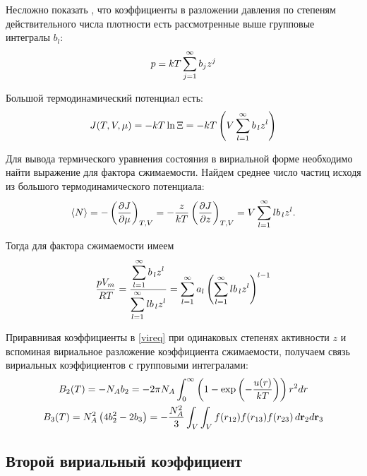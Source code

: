 Несложно показать \cite{meyson}, что коэффициенты в разложении давления по степеням действительного числа плотности есть рассмотренные выше групповые интегралы $b_l$: 
\vverh
\begin{gather}
	p = k T \sum_{j=1}^\infty b_j z^j \notag
\end{gather}

Большой термодинамический потенциал есть:
\vverh
\begin{gather}
	J(T, V, \mu) = - k T \ln \Xi = -k T \left( V \sum_{l=1}^\infty b_{\, l} z^l \right) \notag
\end{gather}

Для вывода термического уравнения состояния в вириальной форме необходимо найти выражение для фактора сжимаемости. Найдем среднее число частиц исходя из большого термодинамического потенциала:
\vverh
\begin{gather}
	\langle N \rangle = - \left( \frac{\partial J}{\partial \mu} \right)_{T, V} = - \frac{z}{kT} \left( \frac{\partial J}{\partial z} \right)_{T, V} = V \sum_{l = 1}^\infty l b_{\, l} z^l. \notag
\end{gather}

Тогда для фактора сжимаемости имеем
\vverh
\begin{gather}
	\frac{p V_m}{RT} = \frac{\displaystyle \sum_{l = 1}^\infty b_{\, l} z^l}{\displaystyle \sum_{l = 1}^\infty l b_{\, l} z^l} = \sum_{l = 1}^\infty a_l \left( \sum_{l = 1}^\infty  l b_{\, l} z^l \right)^{l - 1} \label{vireq}
\end{gather}

Приравнивая коэффициенты в \eqref{vireq} при одинаковых степенях активности $z$ и вспоминая вириальное разложение коэффициента сжимаемости, получаем связь вириальных коэффициентов с групповыми интегралами:
\vverh
\begin{gather}
	B_2(T) = - N_A b_2 = - 2 \pi N_A \int_0^\infty \left( 1 - \exp \left( -\frac{u(r)}{kT} \right) \right) r^2 d r \notag  \\
	B_3(T) = N_A^2 \left( 4 b_2^2 - 2 b_3 \right) = - \frac{N_A^2}{3} \int_V \int_V f(r_{12}) f(r_{13}) f(r_{23}) \, d \mathbf{r}_2 d \mathbf{r}_3 \notag
\end{gather}
\fi

\subsection{Второй вириальный коэффициент \cite{hirsch, meyson}}

